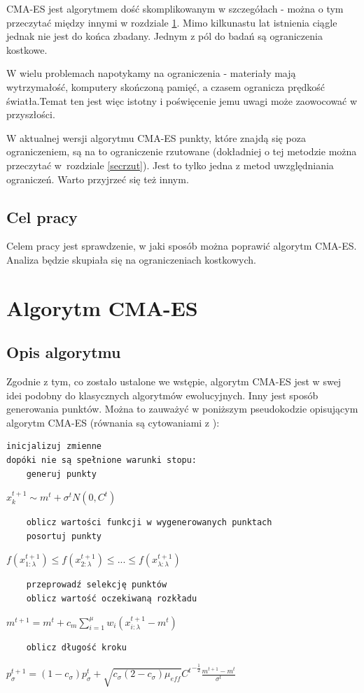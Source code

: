 \documentclass{mini}
\begin{document}
CMA-ES jest algorytmem dość skomplikowanym w szczegółach - można o tym przeczytać między innymi w rozdziale \ref{secalgcmaes}. Mimo kilkunastu lat istnienia ciągle jednak nie jest do końca zbadany. Jednym z pól do badań są ograniczenia kostkowe.

W wielu problemach napotykamy na ograniczenia - materiały mają wytrzymałość, komputery skończoną pamięć, a czasem ogranicza prędkość światła.Temat ten jest więc istotny i poświęcenie jemu uwagi może zaowocować w przyszłości.

W aktualnej wersji algorytmu CMA-ES punkty, które znajdą się poza ograniczeniem, są na to ograniczenie rzutowane (dokładniej o tej metodzie można przeczytać w~rozdziale \ref{secrzut}). Jest to tylko jedna z metod uwzględniania ograniczeń. Warto przyjrzeć się też innym.

\subsection{Cel pracy}
Celem pracy jest sprawdzenie, w jaki sposób można poprawić algorytm CMA-ES. Analiza będzie skupiała się na ograniczeniach kostkowych.

\pagebreak

\section{Algorytm CMA-ES}
\label{secalgcmaes}

\subsection{Opis algorytmu}
Zgodnie z tym, co zostało ustalone we wstępie, algorytm CMA-ES jest w swej idei podobny do klasycznych algorytmów ewolucyjnych. Inny jest sposób generowania punktów. Można to zauważyć w poniższym pseudokodzie opisującym algorytm CMA-ES (równania są cytowaniami z \cite{cmaes_tutorial}):
\begin{Verbatim}
inicjalizuj zmienne
dopóki nie są spełnione warunki stopu:
	generuj punkty
\end{Verbatim}
\hspace{12ex} $x_k^{t+1} \sim m^t + \sigma^tN(0,C^t)$
\begin{Verbatim}
	oblicz wartości funkcji w wygenerowanych punktach
	posortuj punkty
\end{Verbatim}
\hspace{12ex} $f(x_{1:\lambda}^{t+1}) \leq f(x_{2:\lambda}^{t+1}) \leq ... \leq f(x_{\lambda:\lambda}^{t+1})$
\begin{Verbatim}
	przeprowadź selekcję punktów
	oblicz wartość oczekiwaną rozkładu
\end{Verbatim}
\hspace{12ex} $m^{t+1}=m^t+c_m\sum\limits_{i=1}^\mu w_i(x_{i:\lambda}^{t+1}-m^t)$
\begin{Verbatim}
	oblicz długość kroku
\end{Verbatim}
\hspace{12ex} $p_\sigma^{t+1}=(1-c_\sigma)p_\sigma^t+\sqrt{c_\sigma(2-c_\sigma)\mu_{eff}}{C^t}^{-\frac{1}{2}}\frac{m^{t+1}-m^t}{\sigma^t}$
\end{document}
